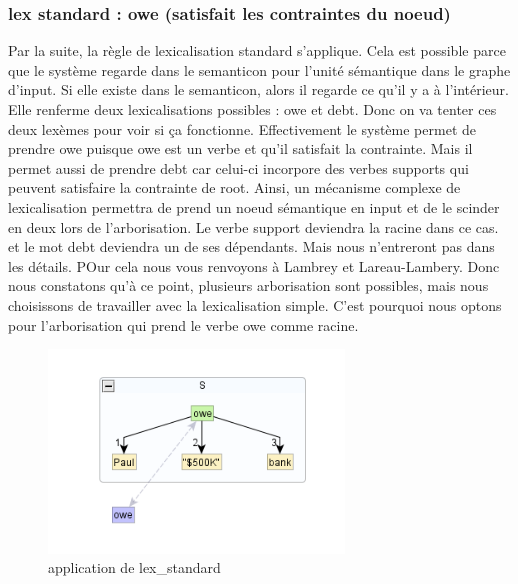 \subsubsection{lex standard : owe (satisfait les contraintes du noeud)}
Par la suite, la règle de lexicalisation standard s'applique. Cela est possible parce que le système regarde dans le semanticon pour l'unité sémantique dans le graphe d'input. Si elle existe dans le semanticon, alors il regarde ce qu'il y a à l'intérieur. Elle renferme deux lexicalisations possibles : owe et debt. Donc on va tenter ces deux lexèmes pour voir si ça fonctionne. Effectivement le système permet de prendre owe puisque owe est un verbe et qu'il satisfait la contrainte. Mais il permet aussi de prendre debt car celui-ci incorpore des verbes supports qui peuvent satisfaire la contrainte de root. Ainsi, un mécanisme complexe de lexicalisation permettra de prend un noeud sémantique en input et de le scinder en deux lors de l'arborisation. Le verbe support deviendra la racine dans ce cas. et le mot debt deviendra un de ses dépendants. Mais nous n'entreront pas dans les détails. POur cela nous vous renvoyons à Lambrey et Lareau-Lambery. Donc nous constatons qu'à ce point, plusieurs arborisation sont possibles, mais nous choisissons de travailler avec la lexicalisation simple. C'est pourquoi nous optons pour l'arborisation qui prend le verbe owe comme racine. 
\begin{figure}[htb]
	\centering
	\includegraphics[width=0.7\textwidth, trim = {0cm 0cm 0cm 0cm},clip]{ch3/figs/lex_standard_root.png}
		\vspace{-0.5cm}
	\caption{application de lex\_standard}
	\label{fig:lexstand1}
\end{figure}

